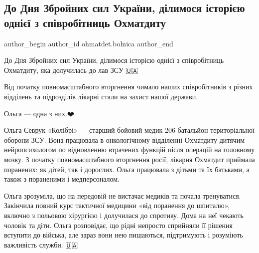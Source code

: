  
 
 
 
 
 
\subsection{До Дня Збройних сил України, ділимося історією однієї з співробітниць Охматдиту}
\label{sec:06_12_2022.fb.ohmatdet.bolnica.1.istoria_zsu}
 
\ifcmt
 author_begin
   author_id ohmatdet.bolnica
 author_end
\fi

До Дня Збройних сил України, ділимося історією однієї з співробітниць
Охматдиту, яка долучилась до лав ЗСУ 🇺🇦

Від початку повномасштабного вторгнення чимало наших співробітників з різних
відділень та підрозділів лікарні стали на захист нашої держави.

Ольга — одна з них.❤️


Ольга Севрук «Колібрі» — старший бойовий медик 206 батальйон територіальної
оборони ЗСУ. Вона працювала в онкологічному відділенні Охматдиту дитячим
нейропсихологом по відновленню втрачених функцій після операцій на головному
мозку. З початку повномасштабного вторгнення росії, лікарня Охматдит приймала
поранених: як дітей, так і дорослих. Ольга працювала з дітьми та їх батьками, а
також з пораненими і медперсоналом.🏥


Ольга зрозуміла, що на передовій не вистачає медиків та почала тренуватися.
Закінчила повний курс тактичної медицини «від поранення до шпиталю», включно з
польовою хірургією і долучилася до спротиву. Дома на неї чекають чоловік та
діти. Ольга розповідає, що рідні непросто сприйняли її рішення вступити до
війська, але зараз вони нею пишаються, підтримують і розуміють важливість
служби. 🇺🇦

